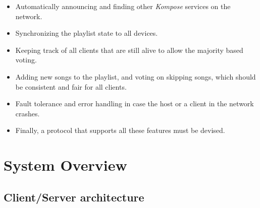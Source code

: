 \documentclass{report}
\begin{document}
\begin{itemize}
	\item Automatically announcing and finding other \emph{Kompose} services on the network.
	\item Synchronizing the playlist state to all devices.
	\item Keeping track of all clients that are still alive to allow the majority based voting.
	\item Adding new songs to the playlist, and voting on skipping songs, which should be consistent and fair for all clients.
	\item Fault tolerance and error handling in case the host or a client in the network crashes.
	\item Finally, a protocol that supports all these features must be devised.
\end{itemize}
\newpage
\section{System Overview}
\subsection{Client/Server architecture}
\end{document}
